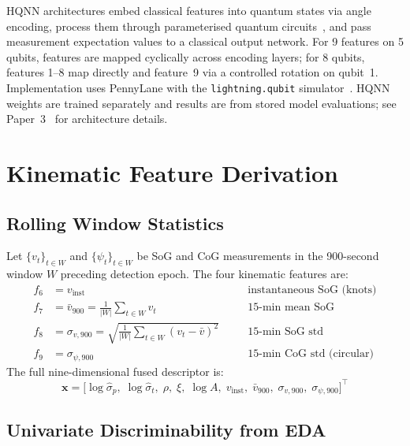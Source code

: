 \documentclass[journal]{IEEEtran}
\newcommand{\vect}[1]{\boldsymbol{#1}}
\begin{document}
HQNN architectures embed classical features into quantum states via
angle encoding, process them through parameterised quantum
circuits~\cite{benedetti2019,cerezo2021}, and pass measurement
expectation values to a classical output network. For 9 features on
5 qubits, features are mapped cyclically across encoding layers;
for 8 qubits, features 1--8 map directly and feature~9 via a
controlled rotation on qubit~1. Implementation uses PennyLane with
the \texttt{lightning.qubit} simulator~\cite{bergholm2018}. HQNN
weights are trained separately and results are from stored model
evaluations; see Paper~3~\cite{paper3qml} for architecture details.

\section{Kinematic Feature Derivation}
\label{sec:features}

\subsection{Rolling Window Statistics}

Let $\{v_t\}_{t \in W}$ and $\{\psi_t\}_{t \in W}$ be SoG and CoG
measurements in the 900-second window $W$ preceding detection epoch.
The four kinematic features are:
\begin{align}
  f_6 &= v_{\text{inst}}
       &\quad&\text{instantaneous SoG (knots)}\label{eq:f6}\\
  f_7 &= \bar{v}_{900} = \frac{1}{|W|}\sum_{t\in W}v_t
       &\quad&\text{15-min mean SoG}\label{eq:f7}\\
  f_8 &= \sigma_{v,900} = \sqrt{\frac{1}{|W|}\sum_{t\in W}(v_t-\bar{v})^2}
       &\quad&\text{15-min SoG std}\label{eq:f8}\\
  f_9 &= \sigma_{\psi,900}
       &\quad&\text{15-min CoG std (circular)}\label{eq:f9}
\end{align}
The full nine-dimensional fused descriptor is:
\begin{equation}
  \vect{x} = \bigl[
    \log\hat{\sigma}_p,\;
    \log\hat{\sigma}_t,\;
    \rho,\;\xi,\;\log A,\;
    v_{\text{inst}},\;\bar{v}_{900},\;\sigma_{v,900},\;\sigma_{\psi,900}
  \bigr]^\top
  \label{eq:desc}
\end{equation}

\subsection{Univariate Discriminability from EDA}
\end{document}
